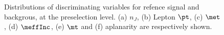 \begin{figure}[h]
    \caption{ 
    Distributions of discriminating variables for refence signal and backgrous, at the preselection level.
    (a) $n_J$, (b) Lepton $\pt$, (c) $\met$, (d) $\meffInc$, (e) $\mt$ and (f) aplanarity are respectively shown.
    \label{fig::SRdefinition::distVar1}       
    }
\end{figure}

